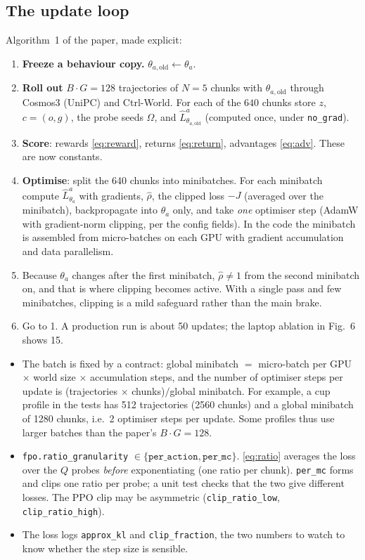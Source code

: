 \documentclass[11pt,a4paper]{article}
\newcommand{\tha}{\theta_a}
\newcommand{\thao}{\theta_{a,\mathrm{old}}}
\newcommand{\Lh}{\hat L^{a}}
\theoremstyle{remark}
\begin{document}
\subsection{The update loop}
Algorithm~1 of the paper, made explicit:
\begin{enumerate}
\item \textbf{Freeze a behaviour copy.} $\thao\leftarrow\tha$.
\item \textbf{Roll out} $B\cdot G=128$ trajectories of $N=5$ chunks with $\thao$ through Cosmos3 (UniPC) and Ctrl-World. For each of the $640$ chunks store $z$, $c=(o,g)$, the probe seeds $\Omega$, and $\Lh_{\thao}$ (computed once, under \texttt{no\_grad}).
\item \textbf{Score}: rewards \eqref{eq:reward}, returns \eqref{eq:return}, advantages \eqref{eq:adv}. These are now constants.
\item \textbf{Optimise}: split the 640 chunks into minibatches. For each minibatch compute $\Lh_{\tha}$ with gradients, $\hat\rho$, the clipped loss $-J$ (averaged over the minibatch), backpropagate into $\tha$ only, and take \emph{one} optimiser step (AdamW with gradient-norm clipping, per the config fields). In the code the minibatch is assembled from micro-batches on each GPU with gradient accumulation and data parallelism.
\item Because $\tha$ changes after the first minibatch, $\hat\rho\neq1$ from the second minibatch on, and that is where clipping becomes active. With a single pass and few minibatches, clipping is a mild safeguard rather than the main brake.
\item Go to 1. A production run is about 50 updates; the laptop ablation in Fig.~6 shows 15.
\end{enumerate}

\begin{codenote}
\begin{itemize}[leftmargin=*]
\item The batch is fixed by a contract: global minibatch $=$ micro-batch per GPU $\times$ world size $\times$ accumulation steps, and the number of optimiser steps per update is (trajectories $\times$ chunks)$/$global minibatch. For example, a cup profile in the tests has 512 trajectories (2560 chunks) and a global minibatch of 1280 chunks, i.e.\ 2 optimiser steps per update. Some profiles thus use larger batches than the paper's $B\cdot G=128$.
\item \texttt{fpo.ratio\_granularity} $\in\{\texttt{per\_action},\texttt{per\_mc}\}$. \eqref{eq:ratio} averages the loss over the $Q$ probes \emph{before} exponentiating (one ratio per chunk). \texttt{per\_mc} forms and clips one ratio per probe; a unit test checks that the two give different losses. The PPO clip may be asymmetric (\texttt{clip\_ratio\_low}, \texttt{clip\_ratio\_high}).
\item The loss logs \texttt{approx\_kl} and \texttt{clip\_fraction}, the two numbers to watch to know whether the step size is sensible.
\end{itemize}
\end{codenote}
\end{document}
